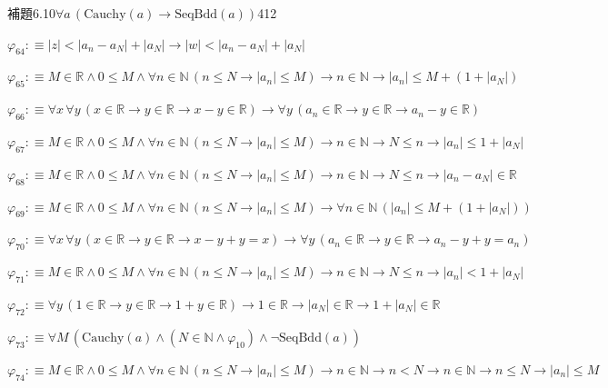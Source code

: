 \begin{fullproof}{補題6.10}{$\forall a\,(\mathrm{Cauchy}(a) \to \mathrm{SeqBdd}(a))$}{412}
\begin{abbrevlist}
\item $\varphi_{64} :\equiv \lvert z \rvert < \lvert a_{n} - a_{N} \rvert + \lvert a_{N} \rvert \to \lvert w \rvert < \lvert a_{n} - a_{N} \rvert + \lvert a_{N} \rvert$
\item $\varphi_{65} :\equiv M \in \mathbb{R} \land 0 \leq M \land \forall n \in \mathbb{N}\,(n \leq N \to \lvert a_{n} \rvert \leq M) \to n \in \mathbb{N} \to \lvert a_{n} \rvert \leq M + (1 + \lvert a_{N} \rvert)$
\item $\varphi_{66} :\equiv \forall x\,\forall y\,(x \in \mathbb{R} \to y \in \mathbb{R} \to x - y \in \mathbb{R}) \to \forall y\,(a_{n} \in \mathbb{R} \to y \in \mathbb{R} \to a_{n} - y \in \mathbb{R})$
\item $\varphi_{67} :\equiv M \in \mathbb{R} \land 0 \leq M \land \forall n \in \mathbb{N}\,(n \leq N \to \lvert a_{n} \rvert \leq M) \to n \in \mathbb{N} \to N \leq n \to \lvert a_{n} \rvert \leq 1 + \lvert a_{N} \rvert$
\item $\varphi_{68} :\equiv M \in \mathbb{R} \land 0 \leq M \land \forall n \in \mathbb{N}\,(n \leq N \to \lvert a_{n} \rvert \leq M) \to n \in \mathbb{N} \to N \leq n \to \lvert a_{n} - a_{N} \rvert \in \mathbb{R}$
\item $\varphi_{69} :\equiv M \in \mathbb{R} \land 0 \leq M \land \forall n \in \mathbb{N}\,(n \leq N \to \lvert a_{n} \rvert \leq M) \to \forall n \in \mathbb{N}\,(\lvert a_{n} \rvert \leq M + (1 + \lvert a_{N} \rvert))$
\item $\varphi_{70} :\equiv \forall x\,\forall y\,(x \in \mathbb{R} \to y \in \mathbb{R} \to x - y + y = x) \to \forall y\,(a_{n} \in \mathbb{R} \to y \in \mathbb{R} \to a_{n} - y + y = a_{n})$
\item $\varphi_{71} :\equiv M \in \mathbb{R} \land 0 \leq M \land \forall n \in \mathbb{N}\,(n \leq N \to \lvert a_{n} \rvert \leq M) \to n \in \mathbb{N} \to N \leq n \to \lvert a_{n} \rvert < 1 + \lvert a_{N} \rvert$
\item $\varphi_{72} :\equiv \forall y\,(1 \in \mathbb{R} \to y \in \mathbb{R} \to 1 + y \in \mathbb{R}) \to 1 \in \mathbb{R} \to \lvert a_{N} \rvert \in \mathbb{R} \to 1 + \lvert a_{N} \rvert \in \mathbb{R}$
\item $\varphi_{73} :\equiv \forall M\,(\mathrm{Cauchy}(a) \land (N \in \mathbb{N} \land \varphi_{10}) \land \neg \mathrm{SeqBdd}(a))$
\item $\varphi_{74} :\equiv M \in \mathbb{R} \land 0 \leq M \land \forall n \in \mathbb{N}\,(n \leq N \to \lvert a_{n} \rvert \leq M) \to n \in \mathbb{N} \to n < N \to n \in \mathbb{N} \to n \leq N \to \lvert a_{n} \rvert \leq M$

\end{abbrevlist}
\end{fullproof}
